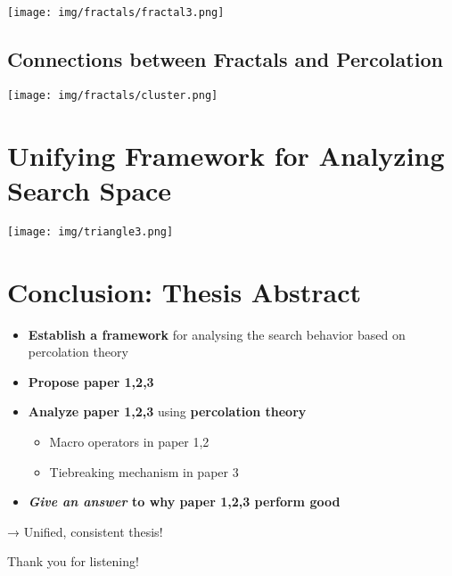\texttt{[image: img/fractals/fractal3.png]}

\subsection{Connections between Fractals and Percolation}
\label{sec-17-10}

\texttt{[image: img/fractals/cluster.png]}

\section{Unifying Framework for Analyzing Search Space}
\label{sec-18}

\texttt{[image: img/triangle3.png]}

\section{Conclusion: Thesis Abstract}
\label{sec-19}

\begin{larger}
\begin{itemize}
\item \textbf{Establish a framework} for analysing the search behavior based on percolation theory
\item \textbf{Propose paper 1,2,3}
\item \textbf{Analyze paper 1,2,3} using \textbf{percolation theory}
\begin{itemize}
\item Macro operators in paper 1,2
\item Tiebreaking mechanism in paper 3
\end{itemize}
\item \textbf{\emph{Give an answer} to why paper 1,2,3 perform good}
\end{itemize}
\end{larger}

\begin{alignright}
→ Unified, consistent thesis!
\end{alignright}

\begin{larger}
\begin{center}
Thank you for listening!
\end{center}
\end{larger}
